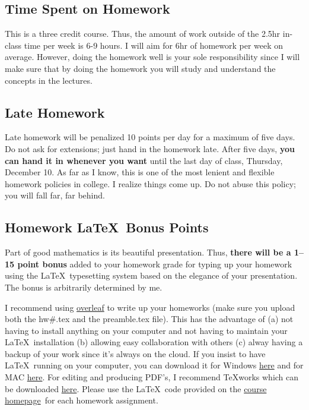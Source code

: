 \documentclass[12pt]{article}
\newcommand{\ingreen}[1]{\color{green}\textbf{#1} \color{black}}
\newcommand{\coursewebpage}{\href{https://github.com/kapelner/QC_Math_241_Fall_2015}{course homepage}}
\begin{document}
\subsection*{Time Spent on Homework }

This is a three credit course. Thus, the amount of work outside of the 2.5hr in-class time per week is 6-9 hours. I will aim for 6hr of homework per week on average. However, doing the homework well is your sole responsibility since I will make sure that by doing the homework you will study and understand the concepts in the lectures.

\subsection*{Late Homework}

Late homework will be penalized 10 points per day for a maximum of five days. Do not ask for extensions; just hand in the homework late. After five days, \textbf{you can hand it in whenever you want} until the last day of class, Thursday, December 10. As far as I know, this is one of the most lenient and flexible homework policies in college. I realize things come up. Do not abuse this policy; you will fall far, far behind.

\subsection*{Homework \LaTeX~Bonus Points}

Part of good mathematics is its beautiful presentation. Thus, \ingreen{there will be a 1--15 point bonus} added to your homework grade  for typing up your homework using the \LaTeX ~typesetting system based on the elegance of your presentation. The bonus is arbitrarily determined by me.

I recommend using \href{http://overleaf.com}{overleaf} to write up your homeworks (make sure you upload both the hw\#.tex and the preamble.tex file). This has the advantage of (a) not having to install anything on your computer and not having to maintain your \LaTeX ~installation (b) allowing easy collaboration with others (c) alway having a backup of your work since it's always on the cloud. If you insist to have \LaTeX ~running on your computer, you can download it for Windows \href{http://www.miktex.org/download}{here} and for MAC \href{http://www.tug.org/mactex/}{here}. For editing and producing PDF's, I recommend \TeX works which can be downloaded \href{http://www.tug.org/texworks/#Getting_TeXworks}{here}. Please use the \LaTeX ~code provided on the \coursewebpage ~for each homework assignment. 
\end{document}

